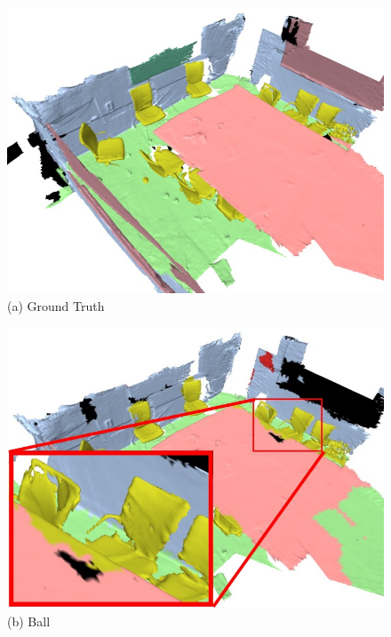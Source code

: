 \begin{figure}[t]
    \centering
    \begin{minipage}{0.32\linewidth}
    \centering
    \includegraphics[width=\linewidth]{texturenet/neighbors/gt.jpg}
    (a) Ground Truth
    \end{minipage}
    \begin{minipage}{0.32\linewidth}
    \centering
    \includegraphics[width=\linewidth]{texturenet/neighbors/pointnet.jpg}
    (b) Ball
    \end{minipage}
    \begin{minipage}{0.32\linewidth}
    \centering

\end{minipage}
\end{figure}
